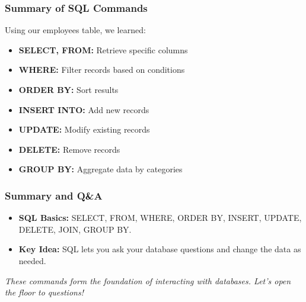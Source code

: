 \documentclass[10pt]{beamer}
\begin{document}
\begin{frame}[fragile]
  \frametitle{Summary of SQL Commands}
  Using our employees table, we learned:
  \begin{itemize}
    \item \textbf{SELECT, FROM:} Retrieve specific columns
    \item \textbf{WHERE:} Filter records based on conditions
    \item \textbf{ORDER BY:} Sort results
    \item \textbf{INSERT INTO:} Add new records
    \item \textbf{UPDATE:} Modify existing records
    \item \textbf{DELETE:} Remove records
    \item \textbf{GROUP BY:} Aggregate data by categories
  \end{itemize}
\end{frame}

\begin{frame}[fragile]
  \frametitle{Summary and Q\&A}
  \begin{itemize}
    \item \textbf{SQL Basics:} SELECT, FROM, WHERE, ORDER BY, INSERT, UPDATE, DELETE, JOIN, GROUP BY.
    \item \textbf{Key Idea:} SQL lets you ask your database questions and change the data as needed.
  \end{itemize}
  \vspace{0.5em}
  \textit{These commands form the foundation of interacting with databases. Let's open the floor to questions!}
\end{frame}
\end{document}
